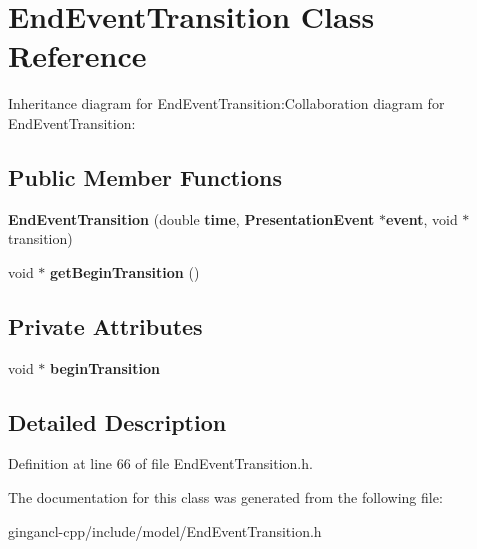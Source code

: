 \section{EndEventTransition Class Reference}
\label{classbr_1_1pucrio_1_1telemidia_1_1ginga_1_1ncl_1_1model_1_1event_1_1transition_1_1EndEventTransition}
Inheritance diagram for EndEventTransition:Collaboration diagram for EndEventTransition:\subsection*{Public Member Functions}
\begin{CompactItemize}
\item 
\textbf{EndEventTransition} (double {\bf time}, {\bf PresentationEvent} $\ast${\bf event}, void $\ast$transition)\label{classbr_1_1pucrio_1_1telemidia_1_1ginga_1_1ncl_1_1model_1_1event_1_1transition_1_1EndEventTransition_ffa39d0e72e32083e8ebe4d56a980c2d}

\item 
void $\ast$ \textbf{getBeginTransition} ()\label{classbr_1_1pucrio_1_1telemidia_1_1ginga_1_1ncl_1_1model_1_1event_1_1transition_1_1EndEventTransition_1d1f9cc874efd7ada74f1338dd07e44c}

\end{CompactItemize}
\subsection*{Private Attributes}
\begin{CompactItemize}
\item 
void $\ast$ {\bf beginTransition}\label{classbr_1_1pucrio_1_1telemidia_1_1ginga_1_1ncl_1_1model_1_1event_1_1transition_1_1EndEventTransition_b1c36e7ecd016fc3e4d665a961dbf352}

\end{CompactItemize}


\subsection{Detailed Description}




Definition at line 66 of file EndEventTransition.h.

The documentation for this class was generated from the following file:\begin{CompactItemize}
\item 
gingancl-cpp/include/model/EndEventTransition.h\end{CompactItemize}
